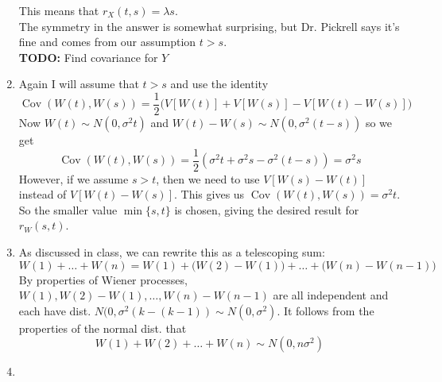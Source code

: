 \documentclass[14pt,letterpaper]{extarticle}
\newcommand*{\Cov}{\operatorname{Cov}}
\newcommand*{\todo}{{\color{red}\textbf{TODO:}} }
\begin{document}
\begin{center}
\begin{enumerate}
        This means that $r_X(t,s)=\lambda s$. \\The symmetry in the answer is somewhat surprising, but Dr. Pickrell says it's fine and comes from our assumption $t>s$. \\
    \todo{Find covariance for $Y$}
\item
    Again I will assume that $t>s$ and use the identity 
    \[ \Cov(W(t),W(s))=\frac{1}{2}\Big(V[W(t)]+V[W(s)]-V[W(t)-W(s)]\Big) \]
    Now $W(t)\sim N(0,\sigma^2t)$ and $W(t)-W(s)\sim N(0,\sigma^2(t-s))$ so we get 
    \[ \Cov(W(t),W(s))=\frac{1}{2}(\sigma^2 t+\sigma^2 s-\sigma^2(t-s))=\sigma^2s \]
    However, if we assume $s>t$, then we need to use $V[W(s)-W(t)]$ instead of $V[W(t)-W(s)]$. This gives us $\Cov(W(t),W(s))=\sigma^2t$. So the smaller value $\min\{s,t\}$ is chosen, giving the desired result for $r_W(s,t)$.
\item
    As discussed in class, we can rewrite this as a telescoping sum: 
    \[ W(1)+\dots+W(n)=W(1)+\big(W(2)-W(1)\big)+\dots+\big(W(n)-W(n-1)\big) \]
    By properties of Wiener processes, $W(1),W(2)-W(1),\dots,W(n)-W(n-1)$ are all independent and each have dist. $N(0,\sigma^2(k-(k-1))\sim N(0,\sigma^2)$. It follows from the properties of the normal dist. that 
    \[ W(1)+W(2)+\dots+W(n)\sim N(0,n\sigma^2) \]
\item
\end{enumerate}
\end{center}
\end{document}
